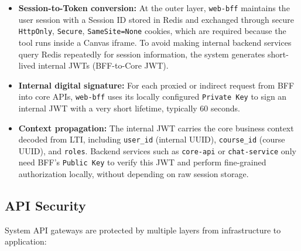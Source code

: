 \begin{itemize}
    \item \textbf{Session-to-Token conversion:} At the outer layer,
          \texttt{web-bff} maintains the user session with a Session ID
          stored in Redis and exchanged through secure
          \texttt{HttpOnly}, \texttt{Secure}, \texttt{SameSite=None}
          cookies, which are required because the tool runs inside a
          Canvas iframe. To avoid making internal backend services query
          Redis repeatedly for session information, the system generates
          short-lived internal JWTs (BFF-to-Core JWT).
    \item \textbf{Internal digital signature:} For each proxied or
          indirect request from BFF into core APIs, \texttt{web-bff} uses
          its locally configured \texttt{Private Key} to sign an internal
          JWT with a very short lifetime, typically 60 seconds.
    \item \textbf{Context propagation:} The internal JWT carries the core
          business context decoded from LTI, including \texttt{user\_id}
          (internal UUID), \texttt{course\_id} (course UUID), and
          \texttt{roles}. Backend services such as \texttt{core-api} or
          \texttt{chat-service} only need BFF's \texttt{Public Key} to
          verify this JWT and perform fine-grained authorization locally,
          without depending on raw session storage.
\end{itemize}

\subsection{API Security}

System API gateways are protected by multiple layers from infrastructure
to application:

